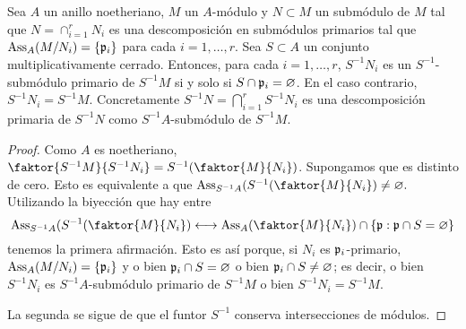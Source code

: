 \documentclass[../main.tex]{subfiles}
\begin{document}
\begin{proposition}
	Sea $A$ un anillo noetheriano, $M$ un $A$-módulo y $N\subset M$ un submódulo de $M$ tal que $N=\cap_{i=1}^rN_i$ es una descomposición en submódulos primarios tal que $\text{Ass}_A(M/N_i)=\{\mathfrak{p}_i\}$ para cada $i=1,\dots,r$. Sea $S\subset A$ un conjunto multiplicativamente cerrado. Entonces, para cada $i=1,\dots,r$, $S^{-1}N_i$ es un $S^{-1}$-submódulo primario de $S^{-1}M$ si y solo si $S\cap\mathfrak{p}_i=\varnothing$. En el caso contrario, $S^{-1}N_i=S^{-1}M$. Concretamente $S^{-1}N=\bigcap_{i=1}^rS^{-1}N_i$ es una descomposición primaria de $S^{-1}N$ como $S^{-1}A$-submódulo de $S^{-1}M.$
\end{proposition}
\begin{proof}
	Como $A$ es noetheriano, $\faktor{S^{-1}M}{S^{-1}N_i}=S^{-1}(\faktor{M}{N_i})$. Supongamos que es distinto de cero. Esto es equivalente a que $\Ass_{S^{-1}A}(S^{-1}(\faktor{M}{N_i})\neq\varnothing.$ Utilizando la biyección que hay entre$$\Ass_{S^{-1}A}(S^{-1}(\faktor{M}{N_i})\longleftrightarrow\Ass_A(\faktor{M}{N_i})\cap\{\p:\p\cap S=\varnothing\}$$tenemos la primera afirmación. Esto es así porque, si $N_i$ es $\mathfrak{p}_i$-primario, $\text{Ass}_A(M/N_i)=\{\mathfrak{p}_i\}$ y o bien $\mathfrak{p}_i\cap S=\varnothing$ o bien $\mathfrak{p}_i\cap S\neq\varnothing$; es decir, o bien $S^{-1}N_i$ es $S^{-1}A$-submódulo primario de $S^{-1}M$ o bien $S^{-1}N_i=S^{-1}M.$
	
	La segunda se sigue de que el funtor $S^{-1}$ conserva intersecciones de módulos.
\end{proof}
\end{document}
